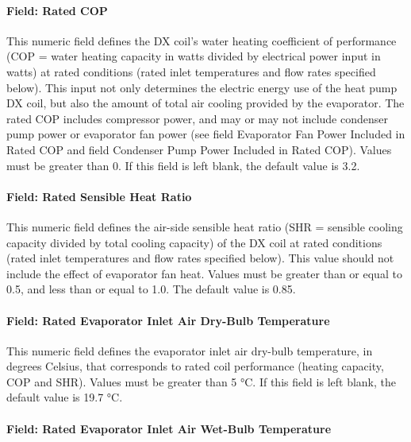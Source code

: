 \paragraph{Field: Rated COP}\label{field-rated-cop}

This numeric field defines the DX coil's water heating coefficient of performance (COP = water heating capacity in watts divided by electrical power input in watts) at rated conditions (rated inlet temperatures and flow rates specified below). This input not only determines the electric energy use of the heat pump DX coil, but also the amount of total air cooling provided by the evaporator. The rated COP includes compressor power, and may or may not include condenser pump power or evaporator fan power (see field Evaporator Fan Power Included in Rated COP and field Condenser Pump Power Included in Rated COP). Values must be greater than 0. If this field is left blank, the default value is 3.2.

\paragraph{Field: Rated Sensible Heat Ratio}\label{field-rated-sensible-heat-ratio-1}

This numeric field defines the air-side sensible heat ratio (SHR = sensible cooling capacity divided by total cooling capacity) of the DX coil at rated conditions (rated inlet temperatures and flow rates specified below). This value should not include the effect of evaporator fan heat. Values must be greater than or equal to 0.5, and less than or equal to 1.0. The default value is 0.85.

\paragraph{Field: Rated Evaporator Inlet Air Dry-Bulb Temperature}\label{field-rated-evaporator-inlet-air-dry-bulb-temperature}

This numeric field defines the evaporator inlet air dry-bulb temperature, in degrees Celsius, that corresponds to rated coil performance (heating capacity, COP and SHR). Values must be greater than 5 °C. If this field is left blank, the default value is 19.7 °C.

\paragraph{Field: Rated Evaporator Inlet Air Wet-Bulb Temperature}\label{field-rated-evaporator-inlet-air-wet-bulb-temperature}

